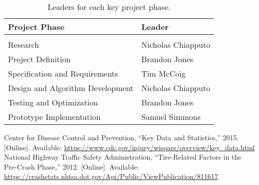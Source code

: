 \documentclass[11pt]{IEEEtran}
\begin{document}
			\begin{table}[tb]
				\centering
				\begin{tabularx}{\linewidth}{l|l}
					Project Phase 						& Leader \\
					\hline
					\vspace{-0.1in}						& \\
					Research 							& Nicholas Chiapputo \\
					Project Definition					& Brandon Jones \\
					Specification and Requirements 		& Tim McCoig \\
					Design and Algorithm Development 	& Nicholas Chiapputo \\
					Testing and Optimization 			& Brandon Jones \\
					Prototype Implementation 			& Samuel Simmons
				\end{tabularx}
				\caption{Leaders for each key project phase.}
				\label{tab:phaseLeaders}
			\end{table}

	\begin{thebibliography}{00}
		 Center for Disease Control and Prevention, ``Key Data and Statistics,'' 2015. [Online]. Available: \url{https://www.cdc.gov/injury/wisqars/overview/key_data.html}
		 National Highway Traffic Safety Administration, ``Tire-Related Factors in the Pre-Crash Phase,'' 2012. [Online]. Available: \url{https://crashstats.nhtsa.dot.gov/Api/Public/ViewPublication/811617}
	\end{thebibliography}
\end{document}
